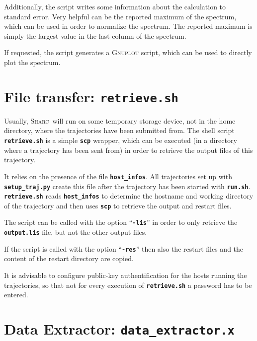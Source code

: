 \documentclass[a4paper,11pt,DIV=15,openany,twoside=false]{scrbook}
\newcommand{\sharc}{\textsc{Sharc}}
\newcommand{\ttt}[1]{\textbf{\texttt{#1}}}
\begin{document}
Additionally, the script writes some information about the calculation to standard error. Very helpful can be the reported maximum of the spectrum, which can be used in order to normalize the spectrum. The reported maximum is simply the largest value in the last column of the spectrum. 

If requested, the script generates a \textsc{Gnuplot} script, which can be used to directly plot the spectrum. 






\section{File transfer: \ttt{retrieve.sh}}\label{sec:retrieve}

Usually, \sharc\ will run on some temporary storage device, not in the home directory, where the trajectories have been submitted from. The shell script \ttt{retrieve.sh} is a simple \ttt{scp} wrapper, which can be executed (in a directory where a trajectory has been sent from) in order to retrieve the output files of this trajectory.

It relies on the presence of the file \ttt{host\_infos}. All trajectories set up with \ttt{setup\_traj.py} create this file after the trajectory has been started with \ttt{run.sh}. \ttt{retrieve.sh} reads \ttt{host\_infos} to determine the hostname and working directory of the trajectory and then uses \ttt{scp} to retrieve the output and restart files.

The script can be called with the option ``\ttt{-lis}'' in order to only retrieve the \ttt{output.lis} file, but not the other output files.

If the script is called with the option ``\ttt{-res}'' then also the restart files and the content of the restart directory are copied.

It is advisable to configure public-key authentification for the hosts running the trajectories, so that not for every execution of \ttt{retrieve.sh} a password has to be entered.











\section{Data Extractor: \ttt{data\_extractor.x}}\label{sec:data_extractor.x}
\end{document}
